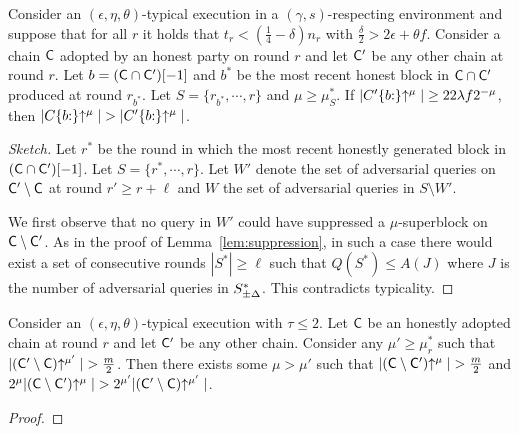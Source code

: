 \begin{theorem}\label{thm:varscp}
  Consider an $(\epsilon, \eta, \theta)$-typical execution in a
  $(\gamma, s)$-respecting environment and suppose that for all $r$ it holds
  that $t_r < (\frac{1}{4} - \delta)n_r$ with
  $\frac{\delta}{2} > 2\epsilon + \theta f$.
  Consider a chain $\mathsf{C}$ adopted by an honest party on round $r$ and let
  $\mathsf{C}'$ be any other chain at round $r$. Let $b =
  (\mathsf{C}\cap\mathsf{C}')[-1]$ and $b^*$ be the most recent honest block in
  $\mathsf{C}\cap\mathsf{C}'$ produced at round $r_{b^*}$. Let $S = \{ r_{b^*}, \cdots,
  r \}$ and $\mu \geq \mu^*_S$. If $|C'\{b{:}\}\negthickspace\uparrow^\mu| \geq 22\lambda
  f 2^{-\mu}$, then $|C\{b{:}\}\negthickspace\uparrow^\mu| >
  |C'\{b{:}\}\negthickspace\uparrow^\mu|$.
\end{theorem}
\begin{proof}[Sketch]
  Let $r^*$ be the round in which the most recent honestly generated block in
  $(\mathsf{C} \cap \mathsf{C}')[-1]$.
  Let $S = \{r^*, \cdots, r\}$. Let $W'$ denote the set of adversarial queries
  on $\mathsf{C}' \setminus \mathsf{C}$ at round $r' \geq r + \ell$ and
  $W$ the set of adversarial queries in $S \setminus W'$.

  We first observe that no query in $W'$ could have suppressed a
  $\mu$-superblock on $\mathsf{C}\setminus\mathsf{C}'$. As in the proof of
  Lemma~\ref{lem:suppression}, in such a case there would exist a set of consecutive
  rounds $|S^*| \geq \ell$ such that $Q(S^*) \leq A(J)$ where $J$ is the number
  of adversarial queries in $S^*_{\pm\Delta}$. This contradicts typicality.

\end{proof}

\begin{lemma}
  Consider an $(\epsilon, \eta, \theta)$-typical execution with $\tau \leq 2$.
  Let $\mathsf{C}$ be an honestly adopted chain at round $r$ and let $\mathsf{C}'$ be
  any other chain. Consider any $\mu' \geq \mu^*_r$ such that
  $|(\mathsf{C}'\setminus\mathsf{C})\negthickspace\uparrow^{\mu'}| > \frac{m}{2}$. Then there exists
  some $\mu > \mu'$ such that $|(\mathsf{C}\setminus\mathsf{C}')\negthickspace\uparrow^\mu| >
  \frac{m}{2}$ and $2^\mu|(\mathsf{C}\setminus\mathsf{C}')\negthickspace\uparrow^\mu| >
  2^{\mu'}|(\mathsf{C}'\setminus\mathsf{C})\negthickspace\uparrow^{\mu'}|$.
\end{lemma}
\begin{proof}
\end{proof}

